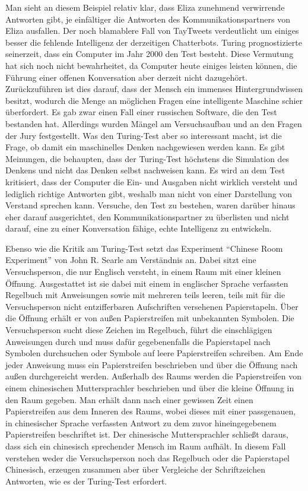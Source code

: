 Man sieht an diesem Beispiel relativ klar, dass Eliza zunehmend verwirrende Antworten gibt, je einfältiger die Antworten des Kommunikationspartners von Eliza ausfallen.
Der noch blamablere Fall von TayTweets verdeutlicht um einiges besser die fehlende Intelligenz der derzeitigen Chatterbots.
Turing prognostizierte seinerzeit, dass ein Computer im Jahr 2000 den Test besteht.
Diese Vermutung hat sich noch nicht bewahrheitet, da Computer heute einiges leisten können, die Führung einer offenen Konversation aber derzeit nicht dazugehört.
Zurückzuführen ist dies darauf, dass der Mensch ein immenses Hintergrundwissen besitzt, wodurch die Menge an möglichen Fragen eine intelligente Maschine schier überfordert.
Es gab zwar einen Fall einer russischen Software, die den Test bestanden hat.
Allerdings wurden Mängel am Versuchsaufbau und an den Fragen der Jury festgestellt.
Was den Turing-Test aber so interessant macht, ist die Frage, ob damit ein maschinelles Denken nachgewiesen werden kann.
Es gibt Meinungen, die behaupten, dass der Turing-Test höchstens die Simulation des Denkens und nicht das Denken selbst nachweisen kann.
Es wird an dem Test kritisiert, dass der Computer die Ein- und Ausgaben nicht wirklich versteht und lediglich richtige Antworten gibt, weshalb man nicht von einer Darstellung von Verstand sprechen kann.
Versuche, den Test zu bestehen, waren darüber hinaus eher darauf ausgerichtet, den Kommunikationspartner zu überlisten und nicht darauf, eine zu einer Konversation fähige, echte Intelligenz zu entwickeln.

Ebenso wie die Kritik am Turing-Test setzt das Experiment "`Chinese Room Experiment"' von John R.
Searle am Verständnis an.
Dabei sitzt eine Versuchsperson, die nur Englisch versteht, in einem Raum mit einer kleinen Öffnung.
Ausgestattet ist sie dabei mit einem in englischer Sprache verfassten Regelbuch mit Anweisungen sowie mit mehreren teils leeren, teils mit für die Versuchsperson nicht entzifferbaren Aufschriften versehenen Papierstapeln.
Über die Öffnung erhält er von außen Papierstreifen mit unbekannten Symbolen.
Die Versuchsperson sucht diese Zeichen im Regelbuch, führt die einschlägigen Anweisungen durch und muss dafür gegebenenfalls die Papierstapel nach Symbolen durchsuchen oder Symbole auf leere Papierstreifen schreiben.
Am Ende jeder Anweisung muss ein Papierstreifen beschrieben und über die Öffnung nach außen durchgereicht werden.
Außerhalb des Raums werden die Papierstreifen von einem chinesischen Muttersprachler beschrieben und über die kleine Öffnung in den Raum gegeben.
Man erhält dann nach einer gewissen Zeit einen Papierstreifen aus dem Inneren des Raums, wobei dieses mit einer passgenauen, in chinesischer Sprache verfassten Antwort zu dem zuvor hineingegebenem Papierstreifen beschriftet ist.
Der chinesische Muttersprachler schließt daraus, dass sich ein chinesisch sprechender Mensch im Raum aufhält.
In diesem Fall verstehen weder die Versuchsperson noch das Regelbuch oder die Papierstapel Chinesisch, erzeugen zusammen aber über Vergleiche der Schriftzeichen Antworten, wie es der Turing-Test erfordert.

